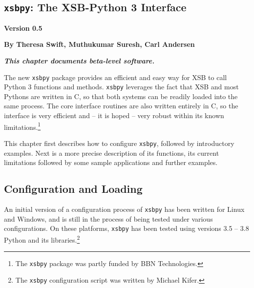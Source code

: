 
\newcommand{\xsbpyversion}{Version 0.5}

\begin{center}
\chapter[XSB and Python]{{\tt xsbpy}: The XSB-Python 3 Interface} \label{chap:xsbpy}
\end{center}

\vspace*{-.30in} 
\begin{center}
{\Large {\bf  \xsbpyversion}}
\end{center}

\begin{center}
  {\Large {\bf By Theresa Swift, Muthukumar Suresh, Carl Andersen}}
\end{center}

\noindent
{\large {\bf {\em This chapter documents beta-level software.}}}

%

The new {\tt xsbpy} package provides an efficient and easy way for XSB
to call Python 3 functions and methods.  {\tt xsbpy} leverages the
fact that XSB and most Pythons are written in C, so that both systems
can be readily loaded into the same process. The core interface
routines are also written entirely in C, so the interface is very
efficient and -- it is hoped -- very robust within its known
limitations.\footnote{The {\tt xsbpy} package was partly funded by BBN
  Technologies.}

This chapter first describes how to configure {\tt xsbpy}, followed by
introductory examples.  Next is a more precise description of its
functions, its current limitations followed by some sample
applications and further examples.

\section{Configuration and Loading}

An initial version of a configuration process of {\tt xsbpy} has been
written for Linux and Windows, and is still in the process of being
tested under various configurations.  On these platforms, {\tt xsbpy}
has been tested using versions 3.5 -- 3.8 Python and its
libraries.\footnote{The {\tt xsbpy} configuration script was written
  by Michael Kifer.}

